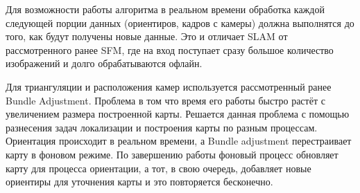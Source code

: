 \vspace{1em}
Для возможности работы алгоритма в реальном времени обработка каждой следующей порции данных (ориентиров, кадров с камеры) должна выполнятся до того, как будут получены новые данные. Это и отличает SLAM от рассмотренного ранее SFM, где на вход поступает сразу большое количество изображений и долго обрабатываются офлайн.

Для триангуляции и расположения камер используется рассмотренный ранее Bundle Adjustment. Проблема в том что время его работы быстро растёт с увеличением размера построенной карты. Решается данная проблема с помощью разнесения задач локализации и построения карты по разным процессам. Ориентация происходит в реальном времени, а Bundle adjustment перестраивает карту в фоновом режиме. По завершению работы фоновый процесс обновляет карту для процесса ориентации, а тот, в свою очередь, добавляет новые ориентиры для уточнения карты и это повторяется бесконечно.
